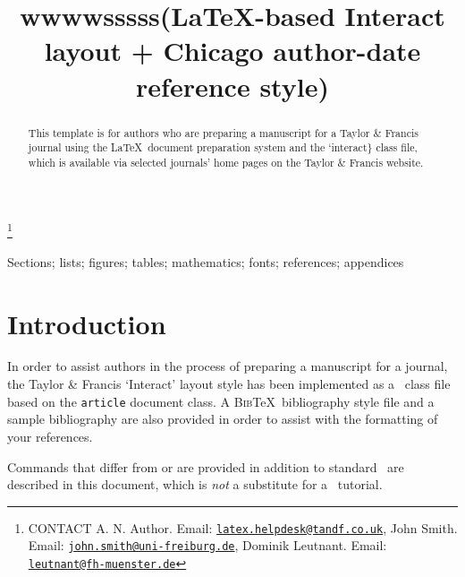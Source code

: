 \documentclass[]{interact}
\theoremstyle{plain}%
\theoremstyle{definition}
\theoremstyle{remark}
\begin{document}

\title{wwwwsssss(\LaTeX-based \textsf{Interact} layout + Chicago
author-date reference style)}


\author{
}

\thanks{CONTACT A. N.
Author. Email: \href{mailto:latex.helpdesk@tandf.co.uk}{\nolinkurl{latex.helpdesk@tandf.co.uk}}, John
Smith. Email: \href{mailto:john.smith@uni-freiburg.de}{\nolinkurl{john.smith@uni-freiburg.de}}, Dominik
Leutnant. Email: \href{mailto:leutnant@fh-muenster.de}{\nolinkurl{leutnant@fh-muenster.de}}}

\maketitle

\begin{abstract}
This template is for authors who are preparing a manuscript for a Taylor
\& Francis journal using the \LaTeX~document preparation system and the
`interact\} class file, which is available via selected journals' home
pages on the Taylor \& Francis website.
\end{abstract}

\begin{keywords}
Sections; lists; figures; tables; mathematics; fonts; references;
appendices
\end{keywords}

\hypertarget{introduction}{%
\section{Introduction}\label{introduction}}

In order to assist authors in the process of preparing a manuscript for
a journal, the Taylor \& Francis `\textsf{Interact}' layout style has
been implemented as a \LaTeXe~class file based on the \texttt{article}
document class. A \textsc{Bib}\TeX~bibliography style file and a sample
bibliography are also provided in order to assist with the formatting of
your references.

Commands that differ from or are provided in addition to standard
\LaTeXe~are described in this document, which is \emph{not} a substitute
for a \LaTeXe~tutorial.
\end{document}
